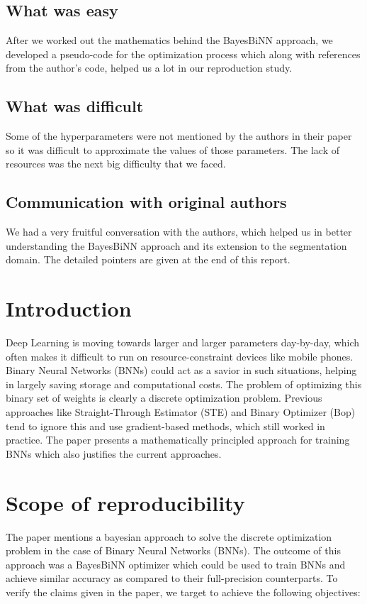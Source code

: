 \subsection*{What was easy}

After we worked out the mathematics behind the BayesBiNN approach, we developed a pseudo-code for the optimization process which along with references from the author's code, helped us a lot in our reproduction study. 

\subsection*{What was difficult}

Some of the hyperparameters were not mentioned by the authors in their paper so it was difficult to approximate the values of those parameters. The lack of resources was the next big difficulty that we faced.

\subsection*{Communication with original authors}

We had a very fruitful conversation with the authors, which helped us in better understanding the BayesBiNN approach and its extension to the segmentation domain. The detailed pointers are given at the end of this report.

\section{Introduction}
Deep Learning is moving towards larger and larger parameters day-by-day, which often makes it difficult to run on resource-constraint devices like mobile phones. Binary Neural Networks (BNNs) could act as a savior in such situations, helping in largely saving storage and computational costs. The problem of optimizing this binary set of weights is clearly a discrete optimization problem. Previous approaches like Straight-Through Estimator (STE) and Binary Optimizer (Bop) tend to ignore this and use gradient-based methods, which still worked in practice. The paper presents a mathematically principled approach for training BNNs which also justifies the current approaches.

\section{Scope of reproducibility}
The paper mentions a bayesian approach to solve the discrete optimization problem in the case of Binary Neural Networks (BNNs). The outcome of this approach was a BayesBiNN optimizer which could be used to train BNNs and achieve similar accuracy as compared to their full-precision counterparts. To verify the claims given in the paper, we target to achieve the following objectives:

